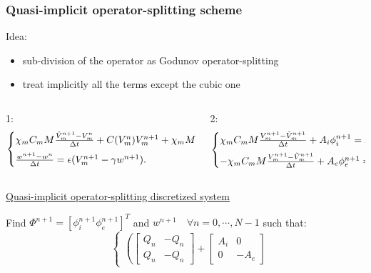 \documentclass[9pt]{beamer}
\begin{document}
\begin{frame}
\frametitle{Quasi-implicit operator-splitting scheme}
Idea:
\begin{itemize}
\item sub-division of the operator as Godunov operator-splitting
\item treat implicitly all the terms except the cubic one
\end{itemize}
\vspace{2mm}
\begin{columns}
            \begin{column}{0.5\textwidth}
\small 1:
 \begin{equation*}
\begin{cases}
\chi_m C_m M \frac{\tilde{V}_m^{n+1}-V_m^n}{\Delta t} +  C(V_m^n) V_m^{n+1} + \chi_m M w^{n+1}= 0,\vspace{2mm}\\
\frac{w^{n+1} - w^n}{\Delta t} = \epsilon (V_m^{n+1}-\gamma w^{n+1}).
\end{cases}
\end{equation*}
            \end{column}
            \hspace{1cm}
            \begin{column}{0.5\textwidth}  
            \small 2:
\begin{equation*}
\begin{cases}
\chi_m C_m M \frac{V_m^{n+1}-\tilde{V}_m^{n+1}}{\Delta t} + A_i \phi_i^{n+1}= F_i^{n+1},\vspace{2mm}\\
- \chi_m C_m M \frac{V_m^{n+1}-\tilde{V}_m^{n+1}}{\Delta t} + A_e \phi_e^{n+1}= F_e^{n+1}.
\end{cases}
\end{equation*}
            \end{column}
     \end{columns}
\vspace{3mm}
\begin{center}
\underline{Quasi-implicit operator-splitting discretized system}
\end{center}
Find $\Phi^{n+1}=[\phi_i^{n+1} \phi_e^{n+1}]^T$ and $w^{n+1} \quad \forall n=0, \cdots, N-1$ such that:
\begin{equation*}
\quad
\begin{cases}
\left(
\begin{bmatrix} Q_n & -Q_n \\ Q_n & -Q_n \end{bmatrix} + 
\begin{bmatrix} A_i & 0 \\ 0 & -A_e\end{bmatrix}

\end{cases}
\end{equation*}
\end{frame}
\end{document}
